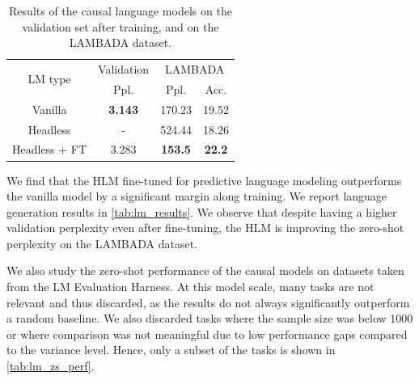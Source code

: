 \begin{table}
\centering
\scriptsize
\begin{tabular}{c|ccc}
\toprule
\multirow{2}{*}{LM type} & Validation & \multicolumn{2}{c}{LAMBADA} \\
        \cmidrule{2-2} \cmidrule{3-4}
        {} & Ppl. & Ppl. & Acc. \\ \midrule
Vanilla  &     \textbf{3.143}  &  170.23 & 19.52 \\ 
Headless  &     -  &  524.44 & 18.26 \\ 
Headless + FT & 3.283 & \textbf{153.5} & \textbf{22.2}\\ \bottomrule
\end{tabular}
\caption{Results of the causal language models on the validation set after training, and on the LAMBADA dataset.}
\label{tab:lm_results}
\end{table}

We find that the HLM fine-tuned for predictive language modeling outperforms the vanilla model by a significant margin along training. We report language generation results in \autoref{tab:lm_results}. We observe that despite having a higher validation perplexity even after fine-tuning, the HLM is improving the zero-shot perplexity on the LAMBADA dataset.

We also study the zero-shot performance of the causal models on datasets taken from the LM Evaluation Harness. At this model scale, many tasks are not relevant and thus discarded, as the results do not always significantly outperform a random baseline. We also discarded tasks where the sample size was below 1000 or where comparison was not meaningful due to low performance gaps compared to the variance level. %
Hence, only a subset of the tasks is shown in
\autoref{tab:lm_zs_perf}.


